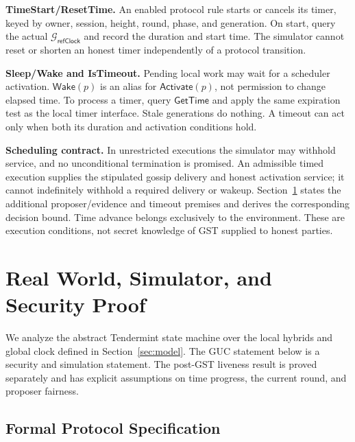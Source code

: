 \documentclass[conference,letterpaper,10pt]{IEEEtran}
\begin{document}
\begin{myframebox}[title={ $\mathcal{F}_{\scriptscriptstyle\mathsf{Tendermint}}$: administration and time}]
\textbf{TimeStart/ResetTime.} An enabled protocol rule starts or cancels its timer, keyed by owner, session, height, round, phase, and generation. On start, query the actual $\mathcal{G}_{\scriptscriptstyle\mathsf{refClock}}$ and record the duration and start time. The simulator cannot reset or shorten an honest timer independently of a protocol transition.

\textbf{Sleep/Wake and IsTimeout.} Pending local work may wait for a scheduler activation. $\mathsf{Wake}(p)$ is an alias for $\mathsf{Activate}(p)$, not permission to change elapsed time. To process a timer, query $\mathsf{GetTime}$ and apply the same expiration test as the local timer interface. Stale generations do nothing. A timeout can act only when both its duration and activation conditions hold.

\textbf{Scheduling contract.} In unrestricted executions the simulator may withhold service, and no unconditional termination is promised. An admissible timed execution supplies the stipulated gossip delivery and honest activation service; it cannot indefinitely withhold a required delivery or wakeup. Section~\ref{sec:protocol} states the additional proposer/evidence and timeout premises and derives the corresponding decision bound. Time advance belongs exclusively to the environment. These are execution conditions, not secret knowledge of GST supplied to honest parties.
\end{myframebox}

\section{Real World, Simulator, and Security Proof}\label{sec:protocol}

We analyze the abstract Tendermint state machine over the local hybrids and global clock defined in Section~\ref{sec:model}. The GUC statement below is a security and simulation statement. The post-GST liveness result is proved separately and has explicit assumptions on time progress, the current round, and proposer fairness.

\subsection{Formal Protocol Specification}
\end{document}
